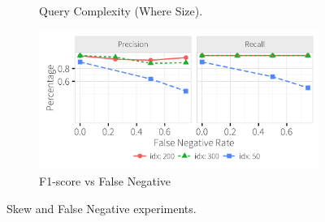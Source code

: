 \begin{figure}[h]
\begin{subfigure}[t]{.3\textwidth}
      \vspace*{-.2in}
      \caption{Query Complexity (Where Size).}
      \label{f:where_time} 
    \end{subfigure}
    \begin{subfigure}[t]{.3\textwidth}
    \includegraphics[width = .99\columnwidth]{figures/noise_fn_acc}
    \vspace*{-.2in}
    \caption{F1-score vs False Negative}
    \label{f:falsenegative_acc} 
    \end{subfigure}
    \vspace*{-.1in}
    \caption{Skew and False Negative experiments. }
  \end{figure}
  \vspace*{-0.1in}

